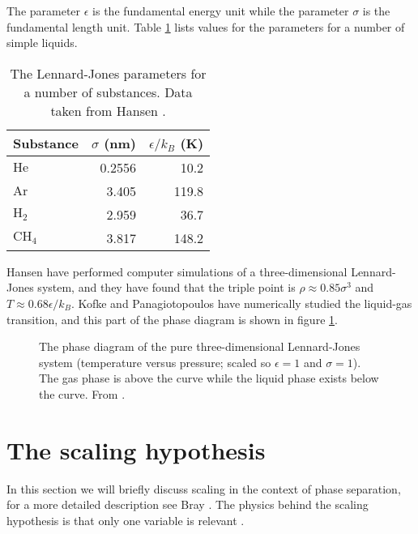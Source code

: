 The parameter $\epsilon$ is the fundamental energy unit while the
parameter $\sigma$ is the fundamental length unit. Table
\ref{tab:LJparams} lists values for the parameters for a number of
simple liquids. 

\begin{table}
  \begin{center}
  \begin{tabular}{lrr}
    \hline
    Substance       & $\sigma$ (nm) & $\epsilon/k_B$ (K) \\ \hline
    $\mathrm{He}$   & 0.2556        & 10.2               \\
    $\mathrm{Ar}$   & 3.405         & 119.8              \\
    $\mathrm{H}_2$  & 2.959         & 36.7               \\
    $\mathrm{CH}_4$ & 3.817         & 148.2              \\
    \hline
  \end{tabular}
  \end{center}
  \caption[Lennard-Jones parameters]{The Lennard-Jones parameters for a
    number of substances. Data taken from Hansen \etal
    \cite{Hansen86}.\label{tab:LJparams}} 
\end{table}

Hansen \etal \cite{Hansen69} have performed computer simulations of
a three-dimensional Lennard-Jones system, and they have found that the
triple point is $\rho \approx 0.85 \sigma^3$ and $T \approx 0.68
\epsilon/k_B$. Kofke \cite{Kofke93} and Panagiotopoulos \cite{Panagio87}
have numerically studied the liquid-gas transition, and
this part of the phase diagram is shown in figure \ref{fig:LJphase}.

\begin{figure}
  \begin{center}
    
  \end{center}
  \caption[Phase diagram for three-dimensional LJ liquid]{The phase
   diagram of the pure three-dimensional Lennard-Jones system (temperature
   versus pressure; scaled so $\epsilon = 1$ and $\sigma = 1$). The gas phase
   is above the curve while the liquid phase exists below the curve. From
   \cite{Kofke93}.\label{fig:LJphase}} 
\end{figure}


\section{The scaling hypothesis}
\label{sect:scale}
In this section we will briefly discuss scaling in the context of phase
separation, for a more detailed description see Bray \cite{Bray94}. The
physics behind the scaling hypothesis is that only one variable is
relevant \cite{Bray94, Goldenfeld92}.

